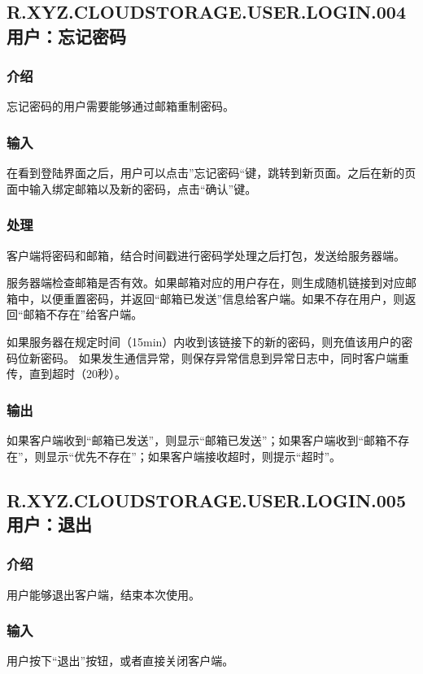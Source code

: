 \subsection{R.XYZ.CLOUDSTORAGE.USER.LOGIN.004 用户：忘记密码 }
\subsubsection{介绍}
忘记密码的用户需要能够通过邮箱重制密码。

\subsubsection{输入}
在看到登陆界面之后，用户可以点击”忘记密码“键，跳转到新页面。之后在新的页面中输入绑定邮箱以及新的密码，点击“确认”键。

\subsubsection{处理}
客户端将密码和邮箱，结合时间戳进行密码学处理之后打包，发送给服务器端。

服务器端检查邮箱是否有效。如果邮箱对应的用户存在，则生成随机链接到对应邮箱中，以便重置密码，并返回“邮箱已发送”信息给客户端。如果不存在用户，则返回“邮箱不存在”给客户端。

如果服务器在规定时间（15min）内收到该链接下的新的密码，则充值该用户的密码位新密码。
如果发生通信异常，则保存异常信息到异常日志中，同时客户端重传，直到超时（20秒）。

\subsubsection{输出}
如果客户端收到“邮箱已发送”，则显示“邮箱已发送”；如果客户端收到“邮箱不存在”，则显示“优先不存在”；如果客户端接收超时，则提示“超时”。

\subsection{R.XYZ.CLOUDSTORAGE.USER.LOGIN.005 用户：退出 }

\subsubsection{介绍}
用户能够退出客户端，结束本次使用。

\subsubsection{输入}
用户按下“退出”按钮，或者直接关闭客户端。

